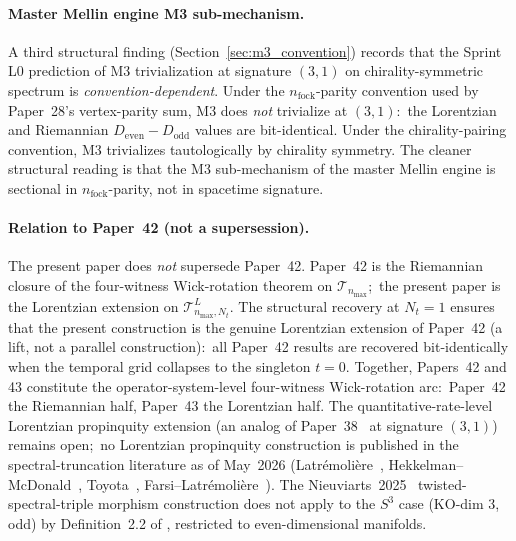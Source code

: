\documentclass[11pt,a4paper]{article}
\theoremstyle{plain}
\theoremstyle{definition}
\newcommand{\nmax}{n_{\max}}
\newcommand{\Nt}{N_t}
\newcommand{\sthree}{S^{3}}
\newcommand{\Tcal}{\mathcal{T}}
\begin{document}
\paragraph{Master Mellin engine M3 sub-mechanism.}
A third structural finding (Section~\ref{sec:m3_convention}) records
that the Sprint L0 prediction of M3 trivialization at signature
$(3, 1)$ on chirality-symmetric spectrum is \emph{convention-dependent}.
Under the $n_\text{fock}$-parity convention used by Paper~28's
vertex-parity sum, M3 does \emph{not} trivialize at $(3, 1)$:\ the
Lorentzian and Riemannian $D_{\text{even}} - D_{\text{odd}}$ values
are bit-identical. Under the chirality-pairing convention, M3
trivializes tautologically by chirality symmetry. The cleaner
structural reading is that the M3 sub-mechanism of the master Mellin
engine is sectional in $n_\text{fock}$-parity, not in spacetime
signature.

\paragraph{Relation to Paper~42 (not a supersession).}
The present paper does \emph{not} supersede Paper~42. Paper~42 is the
Riemannian closure of the four-witness Wick-rotation theorem on
$\Tcal_{\nmax}$;\ the present paper is the Lorentzian extension on
$\Tcal_{\nmax, \Nt}^L$. The structural recovery at $\Nt = 1$ ensures
that the present construction is the genuine Lorentzian extension of
Paper~42 (a lift, not a parallel construction):\ all Paper~42 results
are recovered bit-identically when the temporal grid collapses to the
singleton $t = 0$. Together, Papers~42 and 43 constitute the
operator-system-level four-witness Wick-rotation arc:\ Paper~42 the
Riemannian half, Paper~43 the Lorentzian half. The
quantitative-rate-level Lorentzian propinquity extension (an analog of
Paper~38~\cite{paper38} at signature $(3, 1)$) remains open;\ no
Lorentzian propinquity construction is published in the
spectral-truncation literature as of May~2026
(Latr\'emoli\`ere~\cite{latremoliere2018, latremoliere_metric_st_2017},
Hekkelman--McDonald~\cite{hekkelman_mcdonald2024,
hekkelman_mcdonald2024b}, Toyota~\cite{toyota2023},
Farsi--Latr\'emoli\`ere~\cite{farsi_latremoliere2024,
farsi_latremoliere2025}). The Nieuviarts~2025~\cite{nieuviarts2025a}
twisted-spectral-triple morphism construction does not apply to the
$\sthree$ case (KO-dim 3, odd) by Definition~2.2 of
\cite{nieuviarts2025a}, restricted to even-dimensional manifolds.
\end{document}
